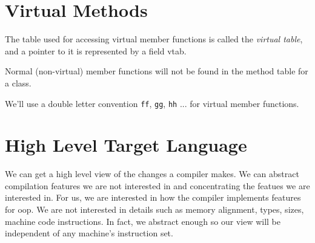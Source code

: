 \begin{figure}[h]
\end{figure} 






\section{Virtual Methods}


The table used for accessing virtual member functions is called 
the \textit{virtual table}, and a pointer to it is represented by a 
field vtab. 


Normal (non-virtual) member functions will not be found in the method table 
for a class. 

We'll use a double letter convention 
\lstinline{ff}, \lstinline{gg}, \lstinline{hh} ... for virtual member functions.





\section{High Level Target Language}

We can get a high level view of the changes a compiler makes.
We can abstract compilation features we are not interested in
and concentrating the featues we are interested in. 
For us, we are interested in how the compiler implements 
features for oop. We are not interested in details such as 
memory alignment, types, sizes, machine code instructions.
In fact, we abstract enough so our view will be independent of 
any machine's instruction set.

